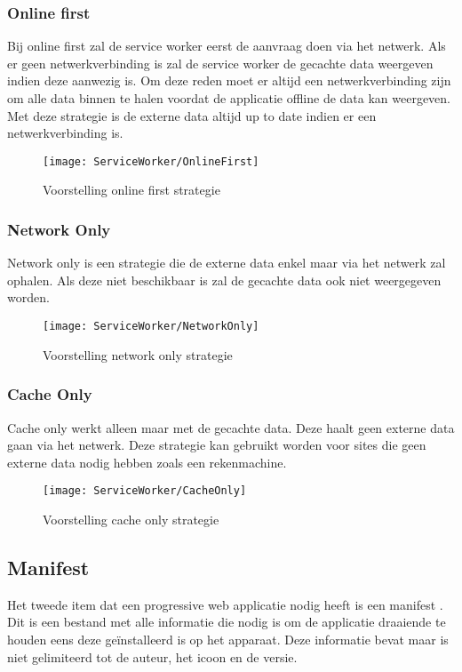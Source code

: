 \subsubsection{Online first}
Bij online first zal de service worker eerst de aanvraag doen via het netwerk. Als er geen netwerkverbinding is zal de service worker de gecachte data weergeven indien deze aanwezig is. Om deze reden moet er altijd een netwerkverbinding zijn om alle data binnen te halen voordat de applicatie offline de data kan weergeven. Met deze strategie is de externe data altijd up to date indien er een netwerkverbinding is.

\begin{figure}[!h]
	\texttt{[image: ServiceWorker/OnlineFirst]}\centering
	\caption{Voorstelling online first strategie}
\end{figure}

\subsubsection{Network Only}
Network only is een strategie die de externe data enkel maar via het netwerk zal ophalen. Als deze niet beschikbaar is zal de gecachte data ook niet weergegeven worden.

\begin{figure}[!h]
	\texttt{[image: ServiceWorker/NetworkOnly]}\centering
	\caption{Voorstelling network only strategie}
\end{figure}

\subsubsection{Cache Only}
Cache only werkt alleen maar met de gecachte data. Deze haalt geen externe data gaan via het netwerk. Deze strategie kan gebruikt worden voor sites die geen externe data nodig hebben zoals een rekenmachine.

\begin{figure}[!h]
	\texttt{[image: ServiceWorker/CacheOnly]}\centering
	\caption{Voorstelling cache only strategie}
\end{figure}

\subsection{Manifest}
Het tweede item dat een progressive web applicatie nodig heeft is een manifest \cite{MANIFEST}. Dit is een bestand met alle informatie die nodig is om de applicatie draaiende te houden eens deze geïnstalleerd is op het apparaat. Deze informatie bevat maar is niet gelimiteerd tot de auteur, het icoon en de versie.

